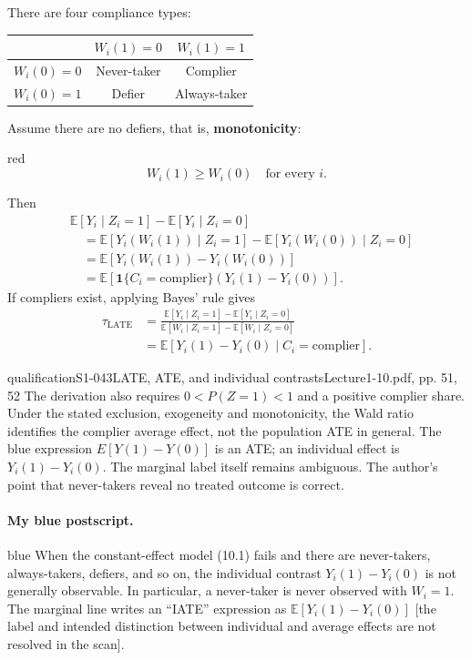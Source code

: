 There are four compliance types:
\begin{center}
\begin{tabular}{lcc}
 & $W_i(1)=0$ & $W_i(1)=1$\\\hline
 $W_i(0)=0$ & Never-taker & Complier\\
 $W_i(0)=1$ & Defier & Always-taker
\end{tabular}
\end{center}
Assume there are no defiers, that is, \textbf{monotonicity}:
\begin{inkblock}{red}
\[
 W_i(1)\ge W_i(0)\quad\text{for every }i.
\]
\end{inkblock}
Then
\begin{align*}
 &\mathbb E[Y_i\mid Z_i=1]-\mathbb E[Y_i\mid Z_i=0]\\
 &\quad=\mathbb E[Y_i(W_i(1))\mid Z_i=1]
 -\mathbb E[Y_i(W_i(0))\mid Z_i=0]\\
 &\quad=\mathbb E[Y_i(W_i(1))-Y_i(W_i(0))]\\
 &\quad=\mathbb E[\mathbf1\{C_i=\mathrm{complier}\}
 (Y_i(1)-Y_i(0))].
\end{align*}
If compliers exist, applying Bayes' rule gives
\begin{align*}
 \tau_{\mathrm{LATE}}
 &=\frac{\mathbb E[Y_i\mid Z_i=1]-\mathbb E[Y_i\mid Z_i=0]}
 {\mathbb E[W_i\mid Z_i=1]-\mathbb E[W_i\mid Z_i=0]}\\
 &=\mathbb E[Y_i(1)-Y_i(0)\mid C_i=\mathrm{complier}].\tag{10.3}
\end{align*}
\begin{reviewnote}{qualification}{S1-043}{LATE, ATE, and individual contrasts}{Lecture1-10.pdf, pp. 51, 52}
The derivation also requires $0<P(Z=1)<1$ and a positive complier share. Under the stated exclusion, exogeneity and monotonicity, the Wald ratio identifies the complier average effect, not the population ATE in general. The blue expression $E[Y(1)-Y(0)]$ is an ATE; an individual effect is $Y_i(1)-Y_i(0)$. The marginal label itself remains ambiguous. The author's point that never-takers reveal no treated outcome is correct.
\end{reviewnote}


\paragraph{My blue postscript.}
\begin{inkblock}{blue}
When the constant-effect model (10.1) fails and there are never-takers, always-takers, defiers, and so on, the individual contrast $Y_i(1)-Y_i(0)$ is not generally observable. In particular, a never-taker is never observed with $W_i=1$. The marginal line writes an ``IATE'' expression as $\mathbb E[Y_i(1)-Y_i(0)]$ [the label and intended distinction between individual and average effects are not resolved in the scan].
\end{inkblock}


